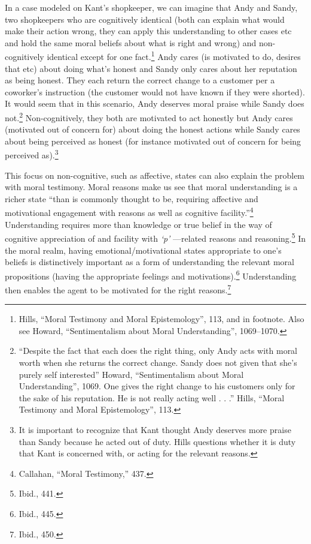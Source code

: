 \documentclass[phdthesis,12pt,final]{wuthesis}
\theoremstyle{definition}
\theoremstyle{definition}
\theoremstyle{definition}
\theoremstyle{definition}
\theoremstyle{remark}
\begin{document}
In a case modeled on Kant's shopkeeper, we can imagine that Andy and Sandy, two shopkeepers who are cognitively identical (both can explain what would make their action wrong, they can apply this understanding to other cases etc and hold the same moral beliefs about what is right and wrong) and non-cognitively identical except for one fact.\footnote{Hills, {``Moral Testimony and Moral Epistemology''}, 113, and in footnote. Also see Howard, {``Sentimentalism about {Moral Understanding}''}, 1069--1070.} Andy cares (is motivated to do, desires that etc) about doing what's honest and Sandy only cares about her reputation as being honest. They each return the correct change to a customer per a coworker's instruction (the customer would not have known if they were shorted). It would seem that in this scenario, Andy deserves moral praise while Sandy does not.\footnote{``Despite the fact that each does the right thing, only Andy acts with moral worth when she returns the correct change. Sandy does not given that she's purely self interested'' Howard, {``Sentimentalism about {Moral Understanding}''}, 1069. One gives the right change to his customers only for the sake of his reputation. He is not really acting well . . .'' Hills, {``Moral Testimony and Moral Epistemology''}, 113.} Non-cognitively, they both are motivated to act honestly but Andy cares (motivated out of concern for) about doing the honest actions while Sandy cares about being perceived as honest (for instance motivated out of concern for being perceived as).\footnote{It is important to recognize that Kant thought Andy deserves more praise than Sandy because he acted out of duty. Hills questions whether it is duty that Kant is concerned with, or acting for the relevant reasons.}

This focus on non-cognitive, such as affective, states can also explain the problem with moral testimony. Moral reasons make us see that moral understanding is a richer state ``than is commonly thought to be, requiring affective and motivational engagement with reasons as well as cognitive facility.''\footnote{Callahan, {``Moral {Testimony},''} 437.} Understanding requires more than knowledge or true belief in the way of cognitive appreciation of and facility with \emph{`p'} ---related reasons and reasoning.\footnote{Ibid., 441.} In the moral realm, having emotional/motivational states appropriate to one's beliefs is distinctively important as a form of understanding the relevant moral propositions (having the appropriate feelings and motivations).\footnote{Ibid., 445.} Understanding then enables the agent to be motivated for the right reasons.\footnote{Ibid., 450.}
\end{document}
